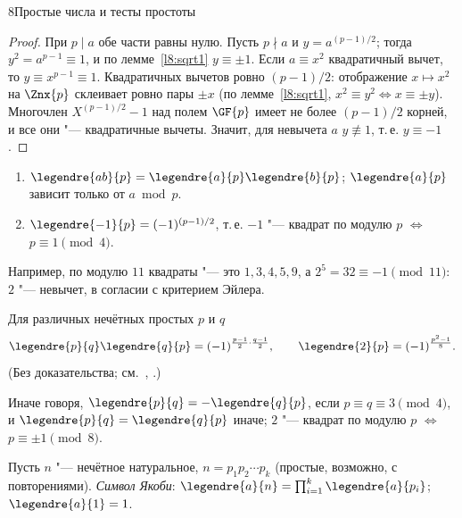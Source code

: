 \begin{lecture}{8}{Простые числа и тесты простоты}
\begin{proof}
При $p \mid a$ обе части равны нулю. Пусть $p \nmid a$ и $y = a^{(p-1)/2}$; тогда
$y^2 = a^{p-1} \equiv 1$, и по лемме~\ref{l8:sqrt1} $y \equiv \pm 1$. Если $a \equiv x^2$
квадратичный вычет, то $y \equiv x^{p-1} \equiv 1$. Квадратичных вычетов ровно $(p - 1)/2$:
отображение $x \mapsto x^2$ на $\Znx{p}$ склеивает ровно пары $\pm x$ (по лемме~\ref{l8:sqrt1},
$x^2 \equiv y^2 \iff x \equiv \pm y$). Многочлен $X^{(p-1)/2} - 1$ над полем $\GF{p}$ имеет не
более $(p - 1)/2$ корней, и все они "--- квадратичные вычеты. Значит, для невычета $a$
$y \not\equiv 1$, т.\,е. $y \equiv -1$.
\end{proof}

\begin{corollary}\label{l8:legendre-props}
\begin{enumerate}
  \item $\legendre{ab}{p} = \legendre{a}{p}\legendre{b}{p}$; $\legendre{a}{p}$ зависит только
    от $a \bmod p$.
  \item $\legendre{-1}{p} = (-1)^{(p-1)/2}$, т.\,е. $-1$ "--- квадрат по модулю $p$ $\iff$
    $p \equiv 1 \pmod 4$.
\end{enumerate}
\end{corollary}

Например, по модулю $11$ квадраты "--- это $1, 3, 4, 5, 9$, а $2^5 = 32 \equiv -1 \pmod{11}$:
$2$ "--- невычет, в согласии с критерием Эйлера.

\begin{theorem}\label{l8:qr}
Для различных нечётных простых $p$ и $q$
\[
  \legendre{p}{q}\legendre{q}{p} = (-1)^{\frac{p-1}{2}\cdot\frac{q-1}{2}}, \qquad
  \legendre{2}{p} = (-1)^{\frac{p^2 - 1}{8}}.
\]
\textup{(Без доказательства; см.~\cite[разд.~3.9]{hps}, \cite[гл.~5]{ireland-rosen}.)}
\end{theorem}

Иначе говоря, $\legendre{p}{q} = -\legendre{q}{p}$, если $p \equiv q \equiv 3 \pmod 4$, и
$\legendre{p}{q} = \legendre{q}{p}$ иначе; $2$ "--- квадрат по модулю $p$ $\iff$
$p \equiv \pm 1 \pmod 8$.

\begin{definition}
Пусть $n$ "--- нечётное натуральное, $n = p_1 p_2 \cdots p_k$ (простые, возможно, с повторениями).
\emph{Символ Якоби}: $\legendre{a}{n} = \prod_{i=1}^{k} \legendre{a}{p_i}$; $\legendre{a}{1} = 1$.
\end{definition}


\end{lecture}
